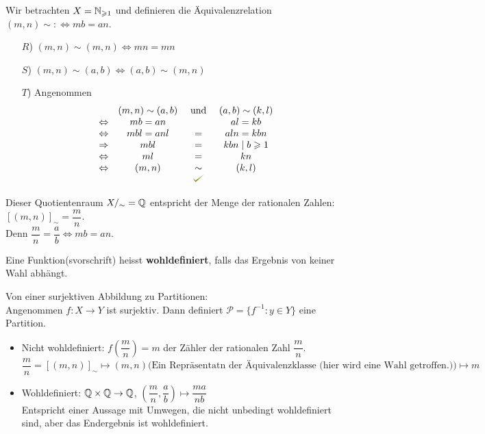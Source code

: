 \documentclass[main.tex]{subfiles}
\begin{document}
\begin{Beispiel}
  Wir betrachten $X = \mathbb{N}_{\geqslant 1}$ und definieren die Äquivalenzrelation $(m,n) \sim :\Leftrightarrow mb = an$.
  \begin{itemize}
    \item[$R$)] $(m,n) \sim (m,n) \Leftrightarrow mn = mn$ \checkmark
    \item[$S$)] $(m,n) \sim (a,b) \Leftrightarrow (a,b) \sim (m,n)$ \checkmark
    \item[$T$)] Angenommen
      $$\begin{array}{c c c c}
        & (m,n) \sim (a,b) & \text{ und } & (a,b) \sim (k,l) \\
        \Leftrightarrow & mb = an & & al = kb  \\
        \Leftrightarrow & mbl = anl & = & aln = kbn \\
        \Rightarrow & mbl & = & kbn \mid b \geq 1 \\
        \Leftrightarrow & ml & = & kn \\
        \Leftrightarrow & (m,n) & \sim & (k,l) \\
        & & \checkmark &
        \end{array}$$
  \end{itemize}

  Dieser Quotientenraum $X/_\sim = \mathbb{Q}$ entspricht der Menge der rationalen Zahlen: $[(m,n)]_\sim = \dfrac{m}{n}$.\\
  Denn $\dfrac{m}{n} = \dfrac{a}{b} \Leftrightarrow mb = an$.
\end{Beispiel}

\begin{Definition}[Wohldefiniertheit]
  Eine Funktion(svorschrift) heisst \textbf{wohldefiniert}, falls das Ergebnis von keiner Wahl abhängt.
\end{Definition}




\begin{Beispiel}
  Von einer surjektiven Abbildung zu Partitionen:\\
  Angenommen $f: X \to Y$ ist surjektiv. Dann definiert $\mathcal{P}=\{f^{-1} : y \in Y \}$ eine Partition.
\end{Beispiel}

\begin{Beispiel}
  \begin{itemize}
    \item Nicht wohldefiniert: $f\left(\dfrac{m}{n}\right) = m$ der Zähler der rationalen Zahl $\dfrac{m}{n}$.\\
    $\dfrac{m}{n} = [(m,n)]_\sim \mapsto (m,n) \text{(Ein Repräsentatn der Äquivalenzklasse (hier wird eine Wahl getroffen.))} \mapsto m$
    \item Wohldefiniert: $\mathbb{Q} \times \mathbb{Q} \to \mathbb{Q}$, $\left(\dfrac{m}{n},\dfrac{a}{b}\right) \mapsto \dfrac{ma}{nb}$\\
    Entspricht einer Aussage mit Umwegen, die nicht unbedingt wohldefiniert sind, aber das Endergebnis ist wohldefiniert.
  \end{itemize}
\end{Beispiel}
\end{document}
